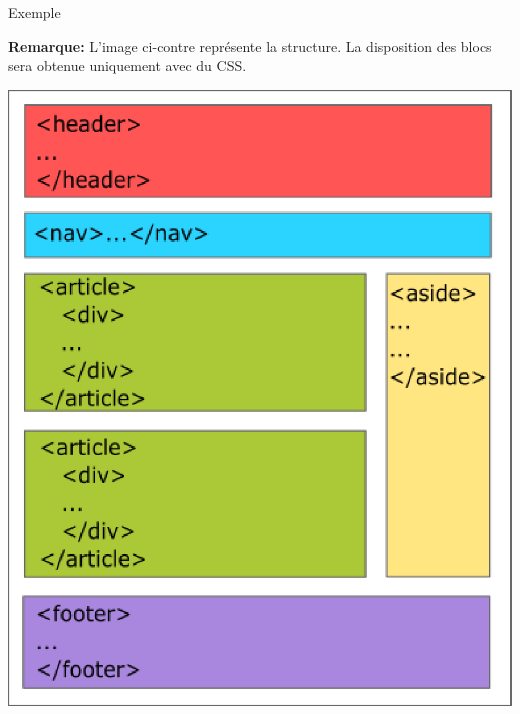 \documentclass[8pt]{beamer}
\begin{document}
\begin{frame}
\begin{exampleblock}{Exemple}
\begin{minipage}{0.54\textwidth}
\textbf{Remarque:} L'image ci-contre représente la structure. La disposition des blocs sera obtenue uniquement avec du CSS.
\end{minipage}\hfill
\begin{minipage}{0.44\textwidth}
\includegraphics[scale=0.5]{img/structureHTML5.eps}
\end{minipage}

\end{exampleblock}

\end{frame}


%
%
\end{document}
